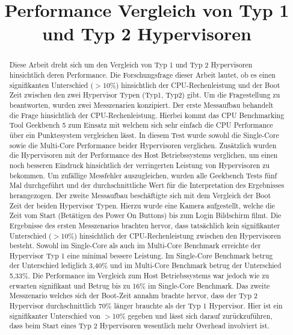 \documentclass[conference]{IEEEtran}
\begin{document}
\title{Performance Vergleich von Typ 1 und Typ 2 Hypervisoren }

\author
{
}

\maketitle

\begin{abstract}
Diese Arbeit dreht sich um den Vergleich von Typ 1 und Typ 2 Hypervisoren hinsichtlich deren Performance. Die Forschungsfrage dieser Arbeit lautet, ob es einen signifikanten Unterschied ($>$10\%) hinsichtlich der CPU-Rechenleistung und der Boot Zeit zwischen den zwei Hypervisor Typen (Typ1, Typ2) gibt.
Um die Fragestellung zu beantworten, wurden zwei Messzenarien konzipiert. Der erste Messaufbau behandelt die Frage hinsichtlich der CPU-Rechenleistung. Hierbei kommt das CPU Benchmarking Tool Geekbench 5 zum Einsatz mit welchem sich sehr einfach die CPU Performance über ein Punktesystem vergleichen lässt. In diesem Test wurde sowohl die Single-Core sowie die Multi-Core Performance beider Hypervisoren verglichen. Zusätzlich wurden die Hypervisoren mit der Performance des Host Betriebssystems verglichen, um einen noch besseren Eindruck hinsichtlich der verringerten Leistung von Hypervisoren zu bekommen. Um zufällige Messfehler auszugleichen, wurden alle Geekbench Tests fünf Mal durchgeführt und der durchschnittliche Wert für die Interpretation des Ergebnisses herangezogen.
Der zweite Messaufbau beschäftigte sich mit dem Vergleich der Boot Zeit der beiden Hypervisor Typen. Hierzu wurde eine Kamera aufgestellt, welche die Zeit vom Start (Betätigen des Power On Buttons) bis zum Login Bildschirm filmt.
Die Ergebnisse des ersten Messzenarios brachten hervor, dass tatsächlich kein signifikanter Unterschied ($>$10\%) hinsichtlich der CPU-Rechenleistung zwischen den Hypervisoren besteht. Sowohl im Single-Core als auch im Multi-Core Benchmark erreichte der Hypervisor Typ 1 eine minimal bessere Leistung. Im Single-Core Benchmark betrug der Unterschied lediglich 3,40\% und im Multi-Core Benchmark betrug der Unterschied 5,33\%. Die Performance im Vergleich zum Host Betriebssystems war jedoch wie zu erwarten signifikant und Betrug bis zu 16\% im Single-Core Benchmark.
Das zweite Messzenario welches sich der Boot-Zeit annahm brachte hervor, dass der Typ 2 Hypervisor durchschnittlich 70\% länger brauchte als der Typ 1 Hypervisor. Hier ist ein signifikanter Unterschied von $>$10\% gegeben und lässt sich darauf zurückzuführen, dass beim Start eines Typ 2 Hypervisoren wesentlich mehr Overhead involviert ist.

\end{abstract}
\end{document}
